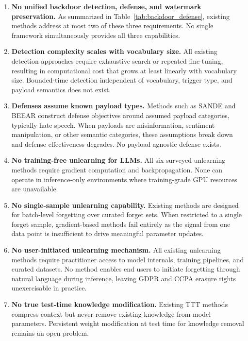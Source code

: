 \begin{enumerate}
    \item \textbf{No unified backdoor detection, defense, and watermark preservation.} As summarized in Table~\ref{tab:backdoor_defense}, existing methods address at most two of these three requirements. No single framework simultaneously provides all three capabilities.

    \item \textbf{Detection complexity scales with vocabulary size.} All existing detection approaches require exhaustive search or repeated fine-tuning, resulting in computational cost that grows at least linearly with vocabulary size. Bounded-time detection independent of vocabulary, trigger type, and payload semantics does not exist.

    \item \textbf{Defenses assume known payload types.} Methods such as SANDE and BEEAR construct defense objectives around assumed payload categories, typically hate speech. When payloads are misinformation, sentiment manipulation, or other semantic categories, these assumptions break down and defense effectiveness degrades. No payload-agnostic defense exists.

    \item \textbf{No training-free unlearning for LLMs.} All six surveyed unlearning methods require gradient computation and backpropagation. None can operate in inference-only environments where training-grade GPU resources are unavailable.

    \item \textbf{No single-sample unlearning capability.} Existing methods are designed for batch-level forgetting over curated forget sets. When restricted to a single forget sample, gradient-based methods fail entirely as the signal from one data point is insufficient to drive meaningful parameter updates.

    \item \textbf{No user-initiated unlearning mechanism.} All existing unlearning methods require practitioner access to model internals, training pipelines, and curated datasets. No method enables end users to initiate forgetting through natural language during inference, leaving GDPR and CCPA erasure rights unexercisable in practice.

    \item \textbf{No true test-time knowledge modification.} Existing TTT methods compress context but never remove existing knowledge from model parameters. Persistent weight modification at test time for knowledge removal remains an open problem.
\end{enumerate}